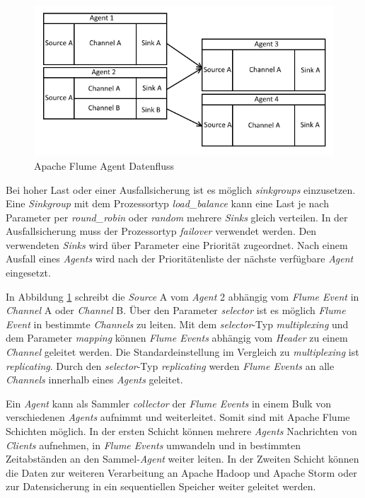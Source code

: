 \begin{figure}[htb!]
\centering
\includegraphics[width=1.0\textwidth]{bilder/flumeAgentChaining.png}
\caption{Apache Flume Agent Datenfluss
\label{fig:flumeAgentChaining}}
\end{figure}

Bei hoher Last oder einer Ausfallsicherung ist es möglich \textit{sinkgroups} einzusetzen. Eine \textit{Sinkgroup} mit dem Prozessortyp \textit{load\_balance} kann eine Last je nach Parameter per \textit{round\_robin} oder \textit{random} mehrere \textit{Sinks} gleich verteilen. In der Ausfallsicherung muss der Prozessortyp \textit{failover} verwendet werden. Den verwendeten \textit{Sinks} wird über Parameter eine Priorität zugeordnet. Nach einem Ausfall eines \textit{Agents} wird nach der Prioritätenliste der nächste verfügbare \textit{Agent} eingesetzt. 

In Abbildung \ref{fig:flumeAgentChaining} schreibt die \textit{Source} A vom \textit{Agent} 2 abhängig vom \textit{Flume Event} in \textit{Channel} A oder \textit{Channel} B. Über den Parameter \textit{selector} ist es möglich \textit{Flume Event} in bestimmte \textit{Channels} zu leiten. Mit dem \textit{selector}-Typ \textit{multiplexing} und dem Parameter \textit{mapping} können \textit{Flume Events} abhängig vom \textit{Header} zu einem \textit{Channel} geleitet werden. Die Standardeinstellung im Vergleich zu \textit{multiplexing} ist \textit{replicating}. Durch den \textit{selector}-Typ \textit{replicating} werden \textit{Flume Events} an alle \textit{Channels} innerhalb eines \textit{Agents} geleitet. 

Ein \textit{Agent} kann als Sammler \textit{collector} der \textit{Flume Events} in einem Bulk von verschiedenen \textit{Agents} aufnimmt und weiterleitet. Somit sind mit Apache Flume Schichten möglich. In der ersten Schicht können mehrere \textit{Agents} Nachrichten von \textit{Clients} aufnehmen, in \textit{Flume Events} umwandeln und in bestimmten Zeitabständen an den Sammel-\textit{Agent} weiter leiten. In der Zweiten Schicht können die Daten zur weiteren Verarbeitung an Apache Hadoop und Apache Storm oder zur Datensicherung in ein sequentiellen Speicher weiter geleitet werden. 

